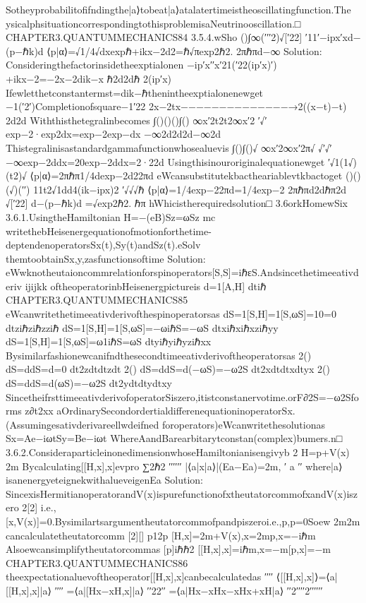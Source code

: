 {{Sotheyprobabilitofifndingthe|a⟩tobeat|a⟩atalatertimeistheoscillatingfunction.The
ysicalphsituationcorrespondingtothisproblemisaNeutrinooscillation.□
CHAPTER3.QUANTUMMECHANICS84
3.5.4.wSho
()∫∞(′′′2)√[′22]
′11′−ipx′xd−(p−ℏk)d
⟨p|α⟩=√1/4√dxexpℏ+ikx−2d2=ℏ√πexp2ℏ2.
2πℏπd−∞
Solution:
Consideringthefactorinsidetheexptialonen
−ip′x′′x′21(′22(ip′x)′)
+ikx−2=−2x−2dik−x
ℏ2d2dℏ
2(ip′x)
Ifewletthetconstantermst=dik−ℏthenintheexptialonenewget
−1(′2′)Completionofsquare−1′22
2x−2tx−−−−−−−−−−−−−−→2((x−t)−t)
2d2d
Withthisthetegralinbecomes
∫()()()∫{()}
∞x′2t2t2∞x′2
′√′
exp−2·exp2dx=exp−2exp−dx
−∞2d2d2d−∞2d
Thistegralinisastandardgammafunctionwhosealuevis
∫{()}∫{()}√
∞x′2∞x′2π√
√′√′
−∞exp−2ddx=20exp−2ddx=2·22d
Usingthisinouroriginalequationewget
′√1(1√)(t2)√
⟨p|α⟩=2πℏπ1/4dexp−2d22πd
eWcansubstitutekbactheariablevtkbactoget
()()(√)(′′)
11t2√1dd4(ik−ipx)2
′√√√ℏ
⟨p|α⟩=1/4exp−22πd=1/4exp−2
2πℏπd2dℏπ2d
√[′22]
d−(p−ℏk)d
=√exp2ℏ2.
ℏπ
hWhicistherequiredsolution□
3.6orkHomewSix
3.6.1.UsingtheHamiltonian
H=−(eB)Sz=ωSz
mc
writethebHeisenergequationofmotionforthetime-deptendenoperatorsSx(t),Sy(t)andSz(t).eSolv
themtoobtainSx,y,zasfunctionsoftime
Solution:
eWwknotheutaioncommrelationforspinoperators[S,S]=iℏεS.Andsincethetimeeativderiv
ijijkk
oftheoperatorinbHeisenergpictureis
d=1[A,H]
dtiℏ
CHAPTER3.QUANTUMMECHANICS85
eWcanwritethetimeeativderivofthespinoperatorsas
dS=1[S,H]=1[S,ωS]=10=0
dtziℏziℏzziℏ
dS=1[S,H]=1[S,ωS]=−ωiℏS=−ωS
dtxiℏxiℏxziℏyy
dS=1[S,H]=1[S,ωS]=ω1iℏS=ωS
dtyiℏyiℏyziℏxx
Bysimilarfashionewcanifndthesecondtimeeativderivoftheoperatorsas
2()
dS=ddS=d=0
dt2zdtdtzdt
2()
dS=ddS=d(−ωS)=−ω2S
dt2xdtdtxdtyx
2()
dS=ddS=d(ωS)=−ω2S
dt2ydtdtydtxy
SincetheifrsttimeeativderivofoperatorSiszero,itistconstanervotime.orF∂2S=−ω2Sforms
z∂t2xx
aOrdinarySecondordertialdifferenequationinoperatorSx.(Assumingesativderivareellwdeifned
foroperators)eWcanwritethesolutionas
Sx=Ae−iωtSy=Be−iωt
WhereAandBarearbitarytconstan(complex)bumers.n□
3.6.2.ConsideraparticleinonedimensionwhoseHamiltonianisengivyb
2
H=p+V(x)
2m
Bycalculating[[H,x],x]evpro
∑2ℏ2
′′′′′′
|⟨a|x|a⟩|(Ea−Ea)=2m,
′
a
′′
where|a⟩isanenergyeteignekwithalueveigenEa
Solution:
SincexisHermitianoperatorandV(x)ispurefunctionofxtheutatorcommofxandV(x)iszero
2[2]
i.e.,[x,V(x)]=0.Bysimilartsargumentheutatorcommofpandpiszeroi.e.,p,p=0Soew
2m2m
cancalculatetheutatorcomm
[2][]
p12p
[H,x]=2m+V(x),x=2mp,x=−iℏm
Alsoewcansimplifytheutatorcommas
[p]iℏℏ2
[[H,x],x]=iℏm,x=−m[p,x]=−m
CHAPTER3.QUANTUMMECHANICS86
theexpectationaluevoftheoperator[[H,x],x]canbecalculatedas
′′′′
⟨[[H,x],x]⟩=⟨a|[[H,x],x]|a⟩
′′′′
=⟨a|[Hx−xH,x]|a⟩
′′22′′
=⟨a|Hx−xHx−xHx+xH|a⟩
′′2′′′′2′′′′′′
}}

